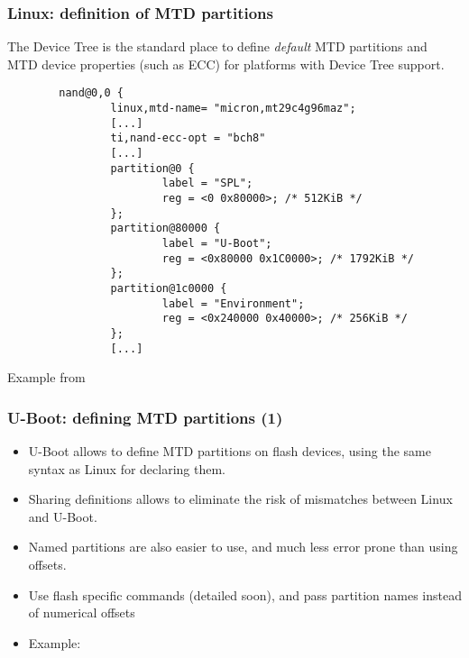\begin{frame}[fragile]
  \frametitle{Linux: definition of MTD partitions}
  \footnotesize
  The Device Tree is the standard place to define {\em default} MTD partitions
  and MTD device properties (such as ECC) for platforms with Device Tree support.
\begin{verbatim}
        nand@0,0 {
                linux,mtd-name= "micron,mt29c4g96maz";
                [...]
                ti,nand-ecc-opt = "bch8"
                [...]
                partition@0 {
                        label = "SPL";
                        reg = <0 0x80000>; /* 512KiB */
                };
                partition@80000 {
                        label = "U-Boot";
                        reg = <0x80000 0x1C0000>; /* 1792KiB */
                };
                partition@1c0000 {
                        label = "Environment";
                        reg = <0x240000 0x40000>; /* 256KiB */
                };
                [...]
\end{verbatim}
  Example from 
\end{frame}

\begin{frame}
  \frametitle{U-Boot: defining MTD partitions (1)}
  \begin{itemize}
  \item U-Boot allows to define MTD partitions on flash devices, using
        the same syntax as Linux for declaring them.
  \item Sharing definitions allows to eliminate the risk
        of mismatches between Linux and U-Boot.
  \item Named partitions are also easier to use, and much less error prone than using offsets.
  \item Use flash specific commands (detailed soon),
    and pass partition names instead of numerical offsets
  \item Example: 
  \end{itemize}
\end{frame}

